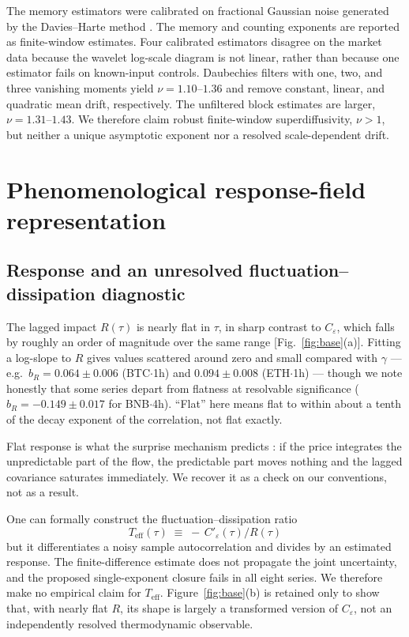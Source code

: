 \documentclass[aps,pre,twocolumn,superscriptaddress,floatfix,nofootinbib]{revtex4-2}
\newcommand{\eps}{\varepsilon}
\newcommand{\Teff}{T_{\mathrm{eff}}}
\begin{document}
The memory estimators were calibrated on fractional Gaussian noise generated
by the Davies--Harte method \cite{davies1987}. The memory and counting exponents
are reported as finite-window estimates.
Four calibrated estimators disagree on the market data because the wavelet
log-scale diagram is not linear, rather than because one estimator fails on
known-input controls. Daubechies filters with one, two, and three vanishing
moments \cite{daubechies1992,percival2000} yield
$\nu=1.10$--$1.36$ and remove constant, linear, and quadratic mean drift,
respectively. The unfiltered block estimates are larger,
$\nu=1.31$--$1.43$. We therefore claim robust finite-window
superdiffusivity, $\nu>1$, but neither a unique asymptotic exponent nor a
resolved scale-dependent drift.

\section{Phenomenological response-field representation}
\label{sec:model}

\subsection{Response and an unresolved fluctuation--dissipation diagnostic}
\label{sec:response}

The lagged impact $R(\tau)$ is nearly flat in $\tau$, in sharp contrast to
$C_\eps$, which falls by roughly an order of magnitude over the same range
[Fig.~\ref{fig:base}(a)]. Fitting a log-slope to $R$ gives values scattered
around zero and small compared with $\gamma$ --- e.g.\ $b_R = 0.064\pm0.006$
(BTC$\cdot$1h) and $0.094\pm0.008$ (ETH$\cdot$1h) --- though we note honestly
that some series depart from flatness at resolvable significance
($b_R = -0.149\pm0.017$ for BNB$\cdot$4h). ``Flat'' here means flat to within
about a tenth of the decay exponent of the correlation, not flat exactly.

Flat response is what the surprise mechanism predicts
\cite{gerig2008,jaisson2014,muhlekarbe2026}: if the price integrates the
unpredictable part of the flow, the predictable part moves nothing and the
lagged covariance saturates immediately. We recover it as a check on our
conventions, not as a result.

One can formally construct the fluctuation--dissipation ratio
\begin{equation}
  \Teff(\tau) \;\equiv\; -\,C'_\eps(\tau)\big/R(\tau)
\end{equation}
but it differentiates a noisy sample autocorrelation and divides by an
estimated response. The finite-difference estimate does not propagate the
joint uncertainty, and the proposed single-exponent closure fails in all
eight series. We therefore make no empirical claim for $\Teff$.
Figure~\ref{fig:base}(b) is retained only to show that, with nearly flat
$R$, its shape is largely a transformed version of $C_\eps$, not an
independently resolved thermodynamic observable.
\end{document}
